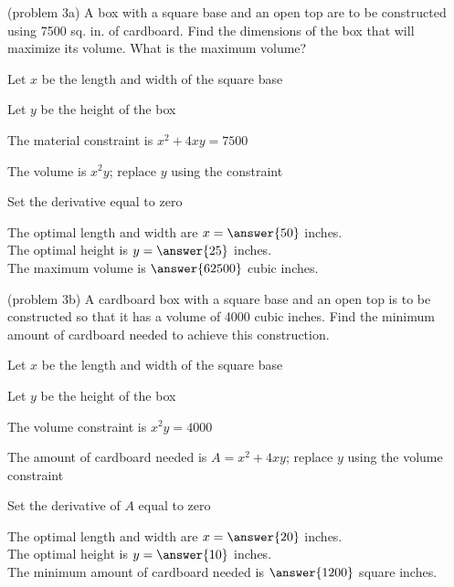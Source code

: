 \documentclass[handout]{ximera}
\begin{document}
\begin{problem}(problem 3a)
A box with a square base and an open top are to be constructed using 7500 sq. in. of cardboard.  
Find the dimensions of the box that will maximize its volume.  What is the maximum volume?
\begin{hint}
Let $x$ be the length and width of the square base
\end{hint}
\begin{hint}
Let $y$ be the height of the box
\end{hint}
\begin{hint}
The material constraint is $x^2 + 4xy = 7500$
\end{hint}
\begin{hint}
The volume is $x^2 y$; replace $y$ using the constraint
\end{hint}
\begin{hint}
Set the derivative equal to zero
\end{hint}

The optimal length and width are $x = \answer{50}$ inches.\\
The optimal height is $y = \answer{25}$ inches.\\
The maximum volume is $ \answer{62500}$ cubic inches.
\end{problem}

\begin{problem}(problem 3b)
A cardboard box with a square base and an open top is to be constructed so that it has a volume of 4000 cubic inches. 
Find the minimum amount of cardboard needed to achieve this construction.
\begin{hint}
Let $x$ be the length and width of the square base
\end{hint}
\begin{hint}
Let $y$ be the height of the box
\end{hint}
\begin{hint}
The volume constraint is $x^2 y = 4000$
\end{hint}
\begin{hint}
The amount of cardboard needed is $A = x^2 + 4xy$; replace $y$ using the volume constraint
\end{hint}
\begin{hint}
Set the derivative of $A$ equal to zero
\end{hint}

The optimal length and width are $x = \answer{20}$ inches.\\
The optimal height is $y = \answer{10}$ inches.\\
The minimum amount of cardboard needed is $ \answer{1200}$ square inches.
\end{problem}
\end{document}
